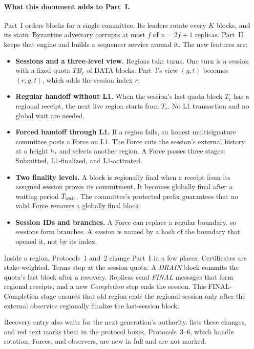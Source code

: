 \documentclass[11pt,a4paper]{article}
\newcommand{\RR}[1]{{\color{rrRed}#1}}
\newcommand{\Twait}{T_{\rm wait}}
\newcommand{\TB}{\mathit{TB}}
\newcommand{\defterm}[1]{\textcolor{rrBlue}{\textit{#1}}}
\newcounter{protocol}
\begin{document}
\paragraph{What this document adds to Part~I.}
Part~I orders blocks for a single committee. Its leaders rotate every
$K$ blocks, and its static Byzantine adversary corrupts at most $f$ of
$n=2f+1$ replicas. Part~II keeps that engine and builds a sequencer
service around it. The new features are:
\begin{itemize}
\item \textbf{Sessions and a three-level view.} Regions take turns. One
turn is a session with a fixed quota $\TB_r$ of DATA blocks. Part~I's
view $(g,t)$ becomes $(r,g,t)$, which adds the session index $r$.
\item \textbf{Regular handoff without L1.} When the session's last quota
block $T_r$ has a regional receipt, the next live region starts from
$T_r$. No L1 transaction and no global wait are needed.
\item \textbf{Forced handoff through L1.} If a region fails, an honest
multisignature committee posts a Force on L1. The Force cuts the
session's external history at a height $h_*$ and selects another
region. A Force passes three stages: Submitted, L1-finalized, and
L1-activated.
\item \textbf{Two finality levels.} A block is regionally final when a
receipt from its assigned session proves its commitment. It becomes
globally final after a waiting period $\Twait$. The committee's
protected prefix guarantees that no valid Force removes a globally final
block.
\item \textbf{Session IDs and branches.} A Force can replace a regular
boundary, so sessions form branches. A session is named by a hash of the
boundary that opened it, not by its index.
\end{itemize}
Inside a region, Protocols~1 and~2 change Part~I in a few places.
Certificates are stake-weighted. Terms stop at the session quota. A
\defterm{DRAIN} block commits the quota's last block after a recovery.
Replicas send \defterm{FINAL} messages that form regional receipts, and a
new \defterm{Completion} step ends the session. 
This FINAL-Completion stage ensures that old region ends the regional session only after the external observice regionally finalize the last-session block.
  
Recovery entry also waits for
the next generation's authority.  lists these changes,
and \RR{red text} marks them in the protocol boxes. Protocols~3--6, which
handle rotation, Forces, and observers, are new in full and are not
marked.
\end{document}
